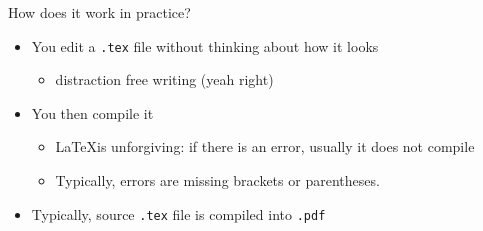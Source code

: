 \documentclass[ignorenonframetext,]{beamer}
\begin{document}
\begin{frame}{How does it work in practice?}

\begin{itemize}
\item
  You edit a \texttt{.tex} file without thinking about how it looks

  \begin{itemize}
  \itemsep1pt\parskip0pt
  \item
    distraction free writing (yeah right)
  \end{itemize}
\item
  You then compile it

  \begin{itemize}
  \itemsep1pt\parskip0pt
  \item
    \LaTeX is unforgiving: if there is an error, usually it does not
    compile
  \item
    Typically, errors are missing brackets or parentheses.
  \end{itemize}
\item
  Typically, source \texttt{.tex} file is compiled into \texttt{.pdf}
\end{itemize}

\end{frame}
\end{document}
